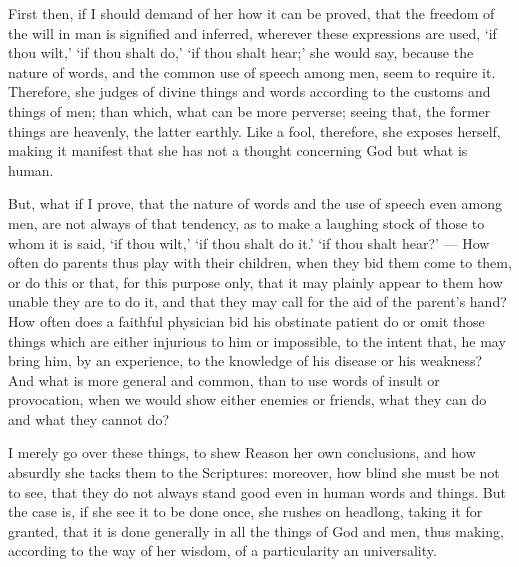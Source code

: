 First then, if I should demand of her how it can be proved, that the freedom of the will in man is signified and inferred, wherever these expressions are used, ‘if thou wilt,’ ‘if thou shalt do,’ ‘if thou shalt hear;’ she would say, because the nature of words, and the common use of speech among men, seem to require it. Therefore, she judges of divine things and words according to the customs and things of men; than which, what can be more perverse; seeing that, the former things are heavenly, the latter earthly. Like a fool, therefore, she exposes herself, making it manifest that she has not a thought concerning God but what is human.

But, what if I prove, that the nature of words and the use of speech even among men, are not always of that tendency, as to make a laughing stock of those to whom it is said, ‘if thou wilt,’ ‘if thou shalt do it.’ ‘if thou shalt hear?’ — How often do parents thus play with their children, when they bid them come to them, or do this or that, for this purpose only, that it may plainly appear to them how unable they are to do it, and that they may call for the aid of the parent’s hand? How often does a faithful physician bid his obstinate patient do or omit those things which are either injurious to him or impossible, to the intent that, he may bring him, by an experience, to the knowledge of his disease or his weakness? And what is more general and common, than to use words of insult or provocation, when we would show either enemies or friends, what they can do and what they cannot do?

I merely go over these things, to shew Reason her own conclusions, and how absurdly she tacks them to the Scriptures: moreover, how blind she must be not to see, that they do not always stand good even in human words and things. But the case is, if she see it to be done once, she rushes on headlong, taking it for granted, that it is done generally in all the things of God and men, thus making, according to the way of her wisdom, of a particularity an universality.


